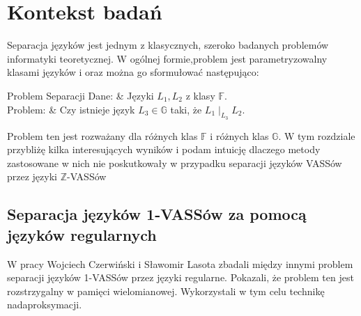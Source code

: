 \documentclass[magisterska]{pracamgr}
\begin{document}
    \chapter{Kontekst badań}
    Separacja języków jest jednym z klasycznych, szeroko badanych problemów informatyki teoretycznej.
    W ogólnej formie,problem jest parametryzowalny klasami języków  i oraz można go sformułować następująco:


    \begin{problem}[]{Problem Separacji}
        Dane: & Języki $L_1,L_2$ z klasy $\mathbb{F}$.\\
        Problem: & Czy istnieje język $L_3 \in \mathbb{G}$ taki, że $L_1 \mid_{L_3} L_2$. \\
    \end{problem}

    Problem ten jest rozważany dla różnych klas $\mathbb{F}$ i różnych klas $\mathbb{G}$.
    W tym rozdziale przybliżę kilka interesujących wyników i podam intuicję dlaczego metody zastosowane w nich nie
    poskutkowały w przypadku separacji języków VASSów przez języki $\mathbb{Z}$-VASSów


    \section{Separacja języków 1-VASSów za pomocą języków regularnych}
    W pracy \cite{DBLP:conf/lics/CzerwinskiL17} Wojciech Czerwiński i Sławomir Lasota zbadali między innymi
    problem separacji języków 1-VASSów przez języki regularne.
    Pokazali, że problem ten jest rozstrzygalny w pamięci wielomianowej.
    Wykorzystali w tym celu technikę nadaproksymacji.
\end{document}
